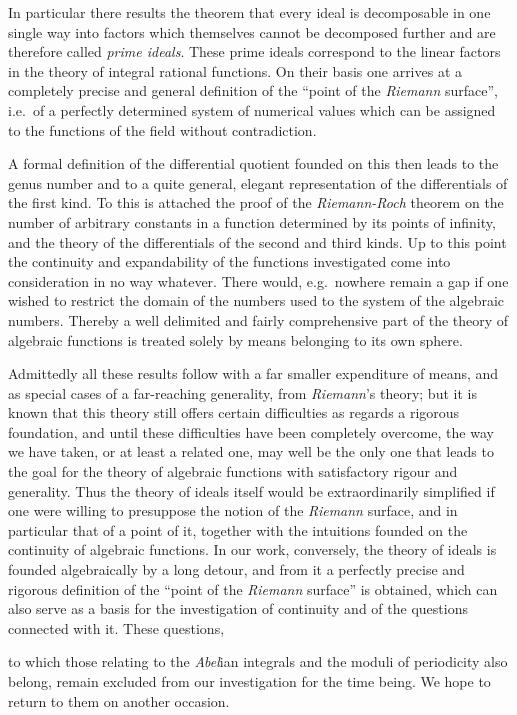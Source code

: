 \documentclass{article}
\begin{document}
In particular there results the theorem that every ideal is decomposable in one single way into factors which themselves cannot be decomposed further and are therefore called \emph{prime ideals}. These prime ideals correspond to the linear factors in the theory of integral rational functions. On their basis one arrives at a completely precise and general definition of the ``point of the \emph{Riemann} surface'', i.e.\ of a perfectly determined system of numerical values which can be assigned to the functions of the field without contradiction.

A formal definition of the differential quotient founded on this then leads to the genus number and to a quite general, elegant representation of the differentials of the first kind. To this is attached the proof of the \emph{Riemann-Roch} theorem on the number of arbitrary constants in a function determined by its points of infinity, and the theory of the differentials of the second and third kinds. Up to this point the continuity and expandability of the functions investigated come into consideration in no way whatever. There would, e.g.\ nowhere remain a gap if one wished to restrict the domain of the numbers used to the system of the algebraic numbers. Thereby a well delimited and fairly comprehensive part of the theory of algebraic functions is treated solely by means belonging to its own sphere.

Admittedly all these results follow with a far smaller expenditure of means, and as special cases of a far-reaching generality, from \emph{Riemann}'s theory; but it is known that this theory still offers certain difficulties as regards a rigorous foundation, and until these difficulties have been completely overcome, the way we have taken, or at least a related one, may well be the only one that leads to the goal for the theory of algebraic functions with satisfactory rigour and generality. Thus the theory of ideals itself would be extraordinarily simplified if one were willing to presuppose the notion of the \emph{Riemann} surface, and in particular that of a point of it, together with the intuitions founded on the continuity of algebraic functions. In our work, conversely, the theory of ideals is founded algebraically by a long detour, and from it a perfectly precise and rigorous definition of the ``point of the \emph{Riemann} surface'' is obtained, which can also serve as a basis for the investigation of continuity and of the questions connected with it. These questions,

to which those relating to the \emph{Abel}ian integrals and the moduli of periodicity also belong, remain excluded from our investigation for the time being. We hope to return to them on another occasion.
\end{document}
